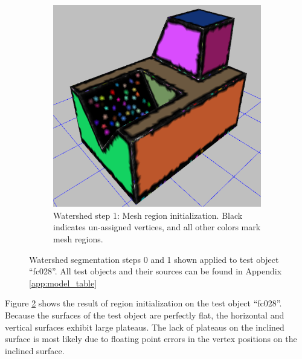 \begin{figure}[htb]
\begin{subfigure}[t]{0.45\textwidth}
		\includegraphics[width=\linewidth]{../resources/watershed/fc028_WS1.png}
		\caption{%
Watershed step 1: Mesh region initialization.
Black indicates un-assigned vertices, and all other colors mark mesh regions.
}
		\label{sfig:ws_1}
	\end{subfigure}
\caption{
Watershed segmentation steps 0 and 1 shown applied to test object ``fc028''.
All test objects and their sources can be found in Appendix \ref{app:model_table}
}
\end{figure}

Figure \ref{sfig:ws_1} shows the result of region initialization on the test object ``fc028''.
Because the surfaces of the test object are perfectly flat, the horizontal and vertical surfaces exhibit large plateaus.
The lack of plateaus on the inclined surface is most likely due to floating point errors in the vertex positions on the inclined surface.

